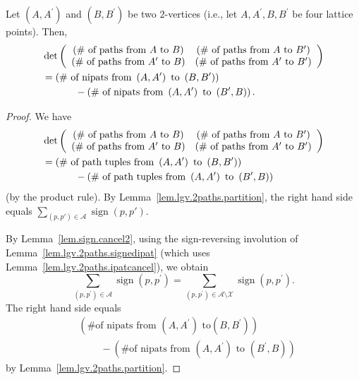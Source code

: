 \begin{proposition}
\label{prop.lgv.2paths.count}
\leantarget
\leanok
Let $\left(
A,A^{\prime}\right)  $ and $\left(  B,B^{\prime}\right)  $ be two $2$-vertices
(i.e., let $A,A^{\prime},B,B^{\prime}$ be four lattice points). Then,
\begin{align*}
&  \det\left(
\begin{array}
[c]{cc}%
\left(  \text{\# of paths from }A\text{ to }B\right)  & \left(  \text{\# of
paths from }A\text{ to }B^{\prime}\right) \\
\left(  \text{\# of paths from }A^{\prime}\text{ to }B\right)  & \left(
\text{\# of paths from }A^{\prime}\text{ to }B^{\prime}\right)
\end{array}
\right) \\
&  =\left(  \text{\# of nipats from }\left(  A,A^{\prime}\right)  \text{ to
}\left(  B,B^{\prime}\right)  \right) \\
&  \ \ \ \ \ \ \ \ \ \ -\left(  \text{\# of nipats from }\left(  A,A^{\prime
}\right)  \text{ to }\left(  B^{\prime},B\right)  \right)  .
\end{align*}
\end{proposition}

\begin{proof}
We have
\begin{align*}
&  \det\left(
\begin{array}
[c]{cc}%
\left(  \text{\# of paths from }A\text{ to }B\right)  & \left(  \text{\# of
paths from }A\text{ to }B^{\prime}\right) \\
\left(  \text{\# of paths from }A^{\prime}\text{ to }B\right)  & \left(
\text{\# of paths from }A^{\prime}\text{ to }B^{\prime}\right)
\end{array}
\right) \\
&  =\left(  \text{\# of path tuples from }\left(  A,A^{\prime}\right)  \text{
to }\left(  B,B^{\prime}\right)  \right) \\
&  \ \ \ \ \ \ \ \ \ \ -\left(  \text{\# of path tuples from }\left(
A,A^{\prime}\right)  \text{ to }\left(  B^{\prime},B\right)  \right)
\end{align*}
(by the product rule). By Lemma~\ref{lem.lgv.2paths.partition},
the right hand side equals
$\sum_{(p,p') \in \mathcal{A}} \operatorname{sign}(p,p')$.

By Lemma~\ref{lem.sign.cancel2}, using the sign-reversing involution
of Lemma~\ref{lem.lgv.2paths.signedipat} (which uses
Lemma~\ref{lem.lgv.2paths.ipatcancel}), we obtain
\[
\sum_{\left(  p,p^{\prime}\right)  \in\mathcal{A}}\operatorname{sign}%
\left(  p,p^{\prime}\right)  =\sum_{\left(  p,p^{\prime}\right)  \in\mathcal{A}%
\setminus\mathcal{X}}\operatorname{sign}\left(  p,p^{\prime}\right).
\]
The right hand side equals
\begin{align*}
&  \left(  \text{\# of nipats from }\left(  A,A^{\prime}\right)  \text{ to
}\left(  B,B^{\prime}\right)  \right) \\
&  \ \ \ \ \ \ \ \ \ \ -\left(  \text{\# of nipats from }\left(  A,A^{\prime
}\right)  \text{ to }\left(  B^{\prime},B\right)  \right)
\end{align*}
by Lemma~\ref{lem.lgv.2paths.partition}.
\end{proof}

